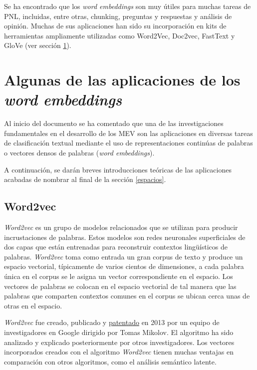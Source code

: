 \documentclass[titlepage]{article}
\begin{document}
Se ha encontrado que los \textit{word embeddings} son muy útiles para muchas tareas de PNL, incluidas, entre otras, chunking, preguntas y respuestas y análisis de opinión. Muchas de sus aplicaciones han sido su incorporación en kits de herramientas ampliamente utilizadas como Word2Vec, Doc2vec, FastText y GloVe (ver sección \ref{aplicaciones}). 

\section{Algunas de las aplicaciones de los \textit{word embeddings}}\label{aplicaciones}

Al inicio del documento se ha comentado que una de las investigaciones fundamentales en el desarrollo de los MEV son las aplicaciones en diversas tareas de clasificación textual mediante el uso de representaciones continúas de palabras o vectores densos de palabras (\textit{word embeddings}). 

A continuación, se darán breves introducciones teóricas de las aplicaciones acabadas de nombrar al final de la sección \ref{espacios}.

\subsection{Word2vec}

\textit{Word2vec}\cite{word2vec} es un grupo de modelos relacionados que se utilizan para producir incrustaciones de palabras. Estos modelos son redes neuronales superficiales de dos capas que están entrenadas para reconstruir contextos lingüísticos de palabras. \textit{Word2vec} toma como entrada un gran corpus de texto y produce un espacio vectorial, típicamente de varios cientos de dimensiones, a cada palabra única en el corpus se le asigna un vector correspondiente en el espacio. Los vectores de palabras se colocan en el espacio vectorial de tal manera que las palabras que comparten contextos comunes en el corpus se ubican cerca unas de otras en el espacio. 

\textit{Word2vec} fue creado, publicado y \href{https://patents.google.com/patent/US9037464B1/en}{patentado} en 2013 por un equipo de investigadores en Google dirigido por Tomas Mikolov. El algoritmo ha sido analizado y explicado posteriormente por otros investigadores. Los vectores incorporados creados con el algoritmo \textit{Word2vec} tienen muchas ventajas en comparación con otros algoritmos, como el análisis semántico latente.
\end{document}
